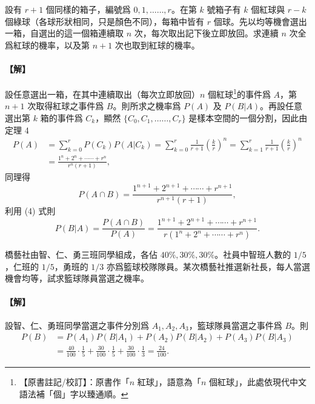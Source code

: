 \medskip
\begin{example}\label{ex:b5-4-9}
設有 $r+1$ 個同樣的箱子，編號爲 $0, 1, \dots\dots, r$。在第 $k$ 號箱子有 $k$ 個紅球與 $r-k$ 個綠球（各球形狀相同，只是顏色不同），每箱中皆有 $r$ 個球。先以均等機會選出一箱，自選出的這一個箱連續取 $n$ 次，每次取出記下後立即放回。求連續 $n$ 次全爲紅球的機率，以及第 $n+1$ 次也取到紅球的機率。
\end{example}
\paragraph{【解】}
設任意選出一箱，在其中連續取出（每次立即放回）$n$ 個紅球\label{note:b5-ch4-ex9-ge}\footnote{【原書註記/校訂】：原書作「$n$ 紅球」，語意為「$n$ 個紅球」，此處依現代中文語法補「個」字以臻通順。}的事件爲 $A$，第 $n+1$ 次取得紅球之事件爲 $B$。則所求之機率爲 $P(A)$ 及 $P(B|A)$。再設任意選出第 $k$ 箱的事件爲 $C_k$，顯然 $\{C_0, C_1, \dots\dots, C_r\}$ 是樣本空間的一個分割，因此由定理 4
\begin{align*}
P(A) &= \sum_{k=0}^r P(C_k) P(A|C_k) = \sum_{k=0}^r \frac{1}{r+1} \left(\frac{k}{r}\right)^n = \sum_{k=1}^r \frac{1}{r+1} \left(\frac{k}{r}\right)^n \\
&= \frac{1^n + 2^n + \cdots\cdots + r^n}{r^n(r+1)},
\end{align*}
同理得
\[
P(A \cap B) = \frac{1^{n+1} + 2^{n+1} + \cdots\cdots + r^{n+1}}{r^{n+1}(r+1)},
\]
利用 (4) 式則
\[
P(B|A) = \frac{P(A \cap B)}{P(A)} = \frac{1^{n+1} + 2^{n+1} + \cdots\cdots + r^{n+1}}{r(1^n + 2^n + \cdots\cdots + r^n)}. \tag*{\#}
\]

\medskip
\begin{example}\label{ex:b5-4-10}
橋藝社由智、仁、勇三班同學組成，各佔 $40\%, 30\%, 30\%$。社員中智班人數的 $1/5$，仁班的 $1/5$，勇班的 $1/3$ 亦爲籃球校隊隊員。某次橋藝社推選新社長，每人當選機會均等，試求籃球隊員當選之機率。
\end{example}
\paragraph{【解】}
設智、仁、勇班同學當選之事件分別爲 $A_1, A_2, A_3$，籃球隊員當選之事件爲 $B$。則
\begin{align*}
P(B) &= P(A_1) P(B|A_1) + P(A_2) P(B|A_2) + P(A_3) P(B|A_3) \\
&= \frac{40}{100} \cdot \frac{1}{5} + \frac{30}{100} \cdot \frac{1}{5} + \frac{30}{100} \cdot \frac{1}{3} = \frac{24}{100}. \tag*{\#}
\end{align*}

